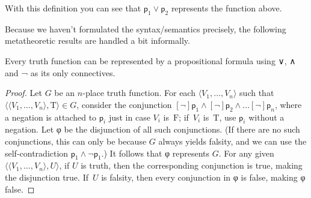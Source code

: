\documentclass[12pt]{report}
\theoremstyle{nonumberplain}
\newtheorem{proof}{Proof}
\newcommand{\T}{\mathrm{T}}
\newcommand{\F}{\mathrm{F}}
\begin{document}
\noindent With this definition you can see that $\mathsf{p}_1 ∨ \mathsf{p}_2$ represents the function above.

Because we haven't formulated the syntax/semantics precisely, the following metatheoretic results are handled a bit informally.

\begin{mt}
Every truth function can be represented by a propositional formula using ∨, ∧ and ¬ as its only connectives.
\end{mt}
\begin{proof}
Let $G$ be an $n$-place truth function. For each $⟨V_1, \dotsc, V_n⟩$ such that $⟨⟨V_1, \dotsc, V_n⟩, \T⟩ ∈ G$, consider the conjunction $[¬]\mathsf{p}_1 ∧ [¬]\mathsf{p}_2 ∧ \ldots [¬]\mathsf{p}_n$, where a negation is attached to $\mathsf{p}_i$ just in case $V_i$ is \,$\F$; if \,$V_i$ is \,$\T$, use $\mathsf{p}_i$ without a negation. Let φ be the disjunction of all such conjunctions. (If there are no such conjunctions, this can only be because $G$ always yields falsity, and we can use the self-contradiction $\mathsf{p}_1 ∧ ¬\mathsf{p}_1$.) It follows that φ represents $G$. For any given $⟨⟨V_1, \dotsc, V_n⟩, U⟩$, if $U$ is truth, then the corresponding conjunction is true, making the disjunction true. If \,$U$ is falsity, then every conjunction in φ is false, making φ false.
\end{proof}
\end{document}
